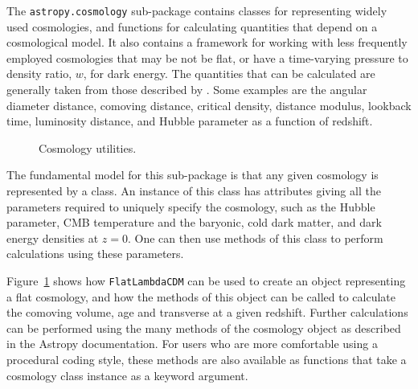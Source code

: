 \documentclass[traditabstract]{aa}
\begin{document}
\label{sec:cosmology}


The \texttt{astropy.cosmology} sub-package contains classes for
representing widely used cosmologies, and functions for calculating
quantities that depend on a cosmological model. It also contains a
framework for working with less frequently employed cosmologies that
may be not be flat, or have a time-varying pressure to density ratio,
$w$, for dark energy. The quantities that can be calculated are
generally taken from those described by \citet{Hogg99}. Some examples
are the angular diameter distance, comoving distance, critical
density, distance modulus, lookback time, luminosity distance, and
Hubble parameter as a function of redshift.

\begin{figure}
\caption{Cosmology utilities.\label{code:cosmology}}
\end{figure}

The fundamental model for this sub-package is that any given cosmology
is represented by a class. An instance of this class has attributes
giving all the parameters required to uniquely specify the cosmology,
such as the Hubble parameter, CMB temperature and the baryonic, cold
dark matter, and dark energy densities at $z=0$. One can then use
methods of this class to perform calculations using these parameters.

Figure~\ref{code:cosmology} shows how \texttt{FlatLambdaCDM} can be
used to create an object representing a flat cosmology, and how the
methods of this object can be called to calculate the comoving volume,
age and transverse at a given redshift. Further calculations can be
performed using the many methods of the cosmology object as described
in the Astropy documentation. For users who are more comfortable using
a procedural coding style, these methods are also available as
functions that take a cosmology class instance as a keyword argument.
\end{document}
